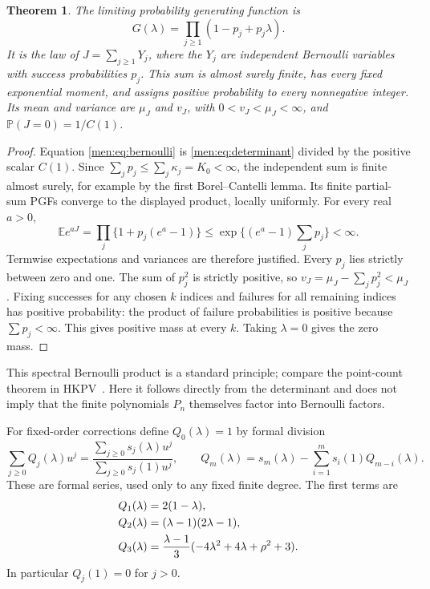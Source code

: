 \documentclass[11pt,letterpaper]{article}
\newtheorem{theorem}{Theorem}[section]
\theoremstyle{remark}\newtheorem{remark}[theorem]{Remark}
\newcommand{\E}{\mathbb E}\newcommand{\PP}{\mathbb P}
\begin{document}
\begin{theorem}\label{men:thm:law}
The limiting probability generating function is
\begin{equation}\label{men:eq:bernoulli}
 G(\lambda)=\prod_{j\ge1}(1-p_j+p_j\lambda).
\end{equation}
It is the law of $J=\sum_{j\ge1}Y_j$, where the $Y_j$ are independent Bernoulli variables with success probabilities $p_j$. This sum is almost surely finite, has every fixed exponential moment, and assigns positive probability to every nonnegative integer. Its mean and variance are $\mu_J$ and $v_J$, with $0<v_J<\mu_J<\infty$, and $\PP(J=0)=1/C(1)$.
\end{theorem}
\begin{proof}
Equation \eqref{men:eq:bernoulli} is \eqref{men:eq:determinant} divided by the positive scalar $C(1)$. Since $\sum_jp_j\le\sum_j\kappa_j=K_0<\infty$, the independent sum is finite almost surely, for example by the first Borel--Cantelli lemma. Its finite partial-sum PGFs converge to the displayed product, locally uniformly. For every real $a>0$,
\[
 \E e^{aJ}=\prod_j\{1+p_j(e^a-1)\}
       \le\exp\{(e^a-1)\textstyle\sum_jp_j\}<\infty.
\]
Termwise expectations and variances are therefore justified. Every $p_j$ lies strictly between zero and one. The sum of $p_j^2$ is strictly positive, so $v_J=\mu_J-\sum_jp_j^2<\mu_J$. Fixing successes for any chosen $k$ indices and failures for all remaining indices has positive probability: the product of failure probabilities is positive because $\sum p_j<\infty$. This gives positive mass at every $k$. Taking $\lambda=0$ gives the zero mass.
\end{proof}

This spectral Bernoulli product is a standard principle; compare the point-count theorem in HKPV~\cite[Theorem 7]{hkpv}. Here it follows directly from the determinant and does not imply that the finite polynomials $P_n$ themselves factor into Bernoulli factors.

For fixed-order corrections define $Q_0(\lambda)=1$ by formal division
\begin{equation}\label{men:eq:Qrec}
 \sum_{j\ge0}Q_j(\lambda)u^j
  =\frac{\sum_{j\ge0}s_j(\lambda)u^j}{\sum_{j\ge0}s_j(1)u^j},
 \qquad
 Q_m(\lambda)=s_m(\lambda)-\sum_{i=1}^m s_i(1)Q_{m-i}(\lambda).
\end{equation}
These are formal series, used only to any fixed finite degree. The first terms are
\begin{align}
 Q_1(\lambda)&=2(1-\lambda),\notag\\
 Q_2(\lambda)&=(\lambda-1)(2\lambda-1),\label{men:eq:Qfirst}\\
 Q_3(\lambda)&=\frac{\lambda-1}{3}
                   (-4\lambda^2+4\lambda+\rho^2+3).\notag
\end{align}
In particular $Q_j(1)=0$ for $j>0$.
\end{document}
